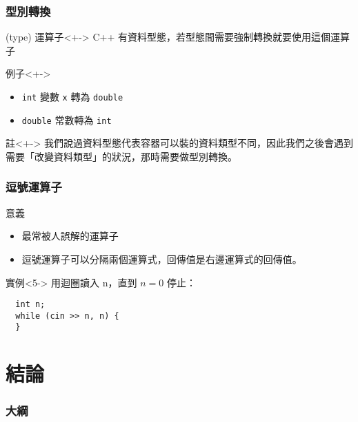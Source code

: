 \documentclass[utf8]{beamer}
\begin{document}
\begin{CJK}{UTF8}{bkai}
\begin{frame}[fragile]
  \frametitle{型別轉換}
  \begin{block}{(type) 運算子}<+->
  C++ 有資料型態，若型態間需要\alert{強制轉換}就要使用這個運算子
  \end{block}
  \begin{exampleblock}{例子}<+->
    \begin{itemize}
    \item \lstinline{int}{} 變數 \lstinline{x}{} 轉為 \lstinline{double}{} %
    \item<+-> \lstinline{double}{} 常數轉為 \lstinline{int}{} %
    \end{itemize}
  \end{exampleblock}
  \begin{alertblock}{註}<+->
  我們說過資料型態代表容器可以裝的資料類型不同，因此我們之後會遇到需要「\alert{改變資料類型}」的狀況，那時需要做型別轉換。
  \end{alertblock}
\end{frame}

\begin{frame}[fragile]
  \frametitle{逗號運算子}
  \begin{block}{意義}
    \begin{itemize}
    \item 最常被人誤解的\alert{運算子}
    \item<4-> 逗號運算子可以\alert{分隔}兩個運算式，回傳值是\alert{右邊}運算式的回傳值。
    \end{itemize}
  \end{block}
  \begin{exampleblock}{實例}<5->
  用迴圈讀入 n，直到 $n=0$ 停止：
    \pause \pause \pause \pause \pause
    \begin{lstlisting}
  int n;
  while (cin >> n, n) {
  }
    \end{lstlisting}
  \end{exampleblock}
\end{frame}

\section{結論}
\begin{frame}
  \frametitle{大綱}
  \begin{multicols}{2}
    \tableofcontents[currentsection]
  \end{multicols}
\end{frame}


\end{CJK}
\end{document}
